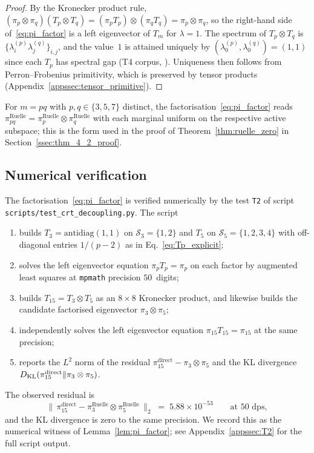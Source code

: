 \begin{proof}
By the Kronecker product rule,
$(\pi_p \otimes \pi_q)(T_p \otimes T_q) = (\pi_p T_p) \otimes
(\pi_q T_q) = \pi_p \otimes \pi_q$, so the right-hand side
of~\eqref{eq:pi_factor} is a left eigenvector of $T_m$ for
$\lambda = 1$.
The spectrum of $T_p \otimes T_q$ is
$\{\lambda_i^{(p)} \lambda_j^{(q)}\}_{i,j}$, and the value~$1$
is attained uniquely by $(\lambda_0^{(p)}, \lambda_0^{(q)}) =
(1, 1)$ since each $T_p$ has spectral gap (T4 corpus,
\cite[Ch.~7]{PT_Monograph}).
Uniqueness then follows from Perron--Frobenius primitivity, which
is preserved by tensor products (Appendix~\ref{appssec:tensor_primitive}).
\end{proof}

For $m = pq$ with $p, q \in \{3, 5, 7\}$ distinct, the
factorisation~\eqref{eq:pi_factor} reads
$\pi_{pq}^{\mathrm{Ruelle}} = \pi_p^{\mathrm{Ruelle}} \otimes
\pi_q^{\mathrm{Ruelle}}$ with each marginal uniform on the
respective active subspace; this is the form used in the proof of
Theorem~\ref{thm:ruelle_zero} in Section~\ref{ssec:thm_4_2_proof}.

\subsection{Numerical verification}
\label{ssec:t2_verification}

The factorisation~\eqref{eq:pi_factor} is verified numerically by
the test \texttt{T2} of
script \texttt{scripts/test\_crt\_decoupling.py}. The script
\begin{enumerate}[itemsep=2pt,leftmargin=*]
  \item builds $T_3 = \mathrm{antidiag}(1, 1)$ on
    $\mathcal{S}_3 = \{1, 2\}$ and $T_5$ on
    $\mathcal{S}_5 = \{1, 2, 3, 4\}$ with off-diagonal entries
    $1/(p-2)$ as in Eq.~\eqref{eq:Tp_explicit};
  \item solves the left eigenvector equation $\pi_p T_p = \pi_p$
    on each factor by augmented least squares
    at \texttt{mpmath} precision $50$~digits;
  \item builds $T_{15} = T_3 \otimes T_5$ as an $8 \times 8$
    Kronecker product, and likewise builds the candidate
    factorised eigenvector $\pi_3 \otimes \pi_5$;
  \item independently solves the left eigenvector equation
    $\pi_{15} T_{15} = \pi_{15}$ at the same precision;
  \item reports the $L^2$ norm of the residual
    $\pi_{15}^{\mathrm{direct}} - \pi_3 \otimes \pi_5$ and the
    KL divergence
    $D_{\mathrm{KL}}(\pi_{15}^{\mathrm{direct}} \| \pi_3 \otimes \pi_5)$.
\end{enumerate}
The observed residual is
\begin{equation}
  \bigl\|\,\pi_{15}^{\mathrm{direct}}
      - \pi_3^{\mathrm{Ruelle}} \otimes \pi_5^{\mathrm{Ruelle}}\,\bigr\|_2
  \;=\; 5.88 \times 10^{-53}
  \qquad \text{at 50 dps},
\end{equation}
and the KL divergence is zero to the same precision. We record this
as the numerical witness of
Lemma~\ref{lem:pi_factor}; see Appendix~\ref{appssec:T2} for the
full script output.
